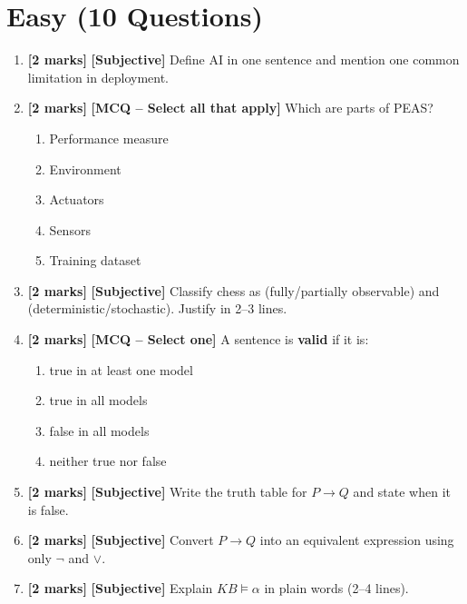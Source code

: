 \documentclass[11pt,a4paper]{article}
\newcommand{\EMarks}{\textbf{[2 marks]} }
\begin{document}
\vspace{0.6em}

\section*{Easy (10 Questions)}
\begin{enumerate}[label=\textbf{E\arabic*.}, leftmargin=*]
  \item \EMarks \textbf{[Subjective]} Define AI in one sentence and mention one common limitation in deployment.

  \item \EMarks \textbf{[MCQ -- Select all that apply]} Which are parts of PEAS?
    \begin{enumerate}[label=(\Alph*), leftmargin=*]
      \item Performance measure
      \item Environment
      \item Actuators
      \item Sensors
      \item Training dataset
    \end{enumerate}

  \item \EMarks \textbf{[Subjective]} Classify chess as (fully/partially observable) and (deterministic/stochastic). Justify in 2--3 lines.

  \item \EMarks \textbf{[MCQ -- Select one]} A sentence is \textbf{valid} if it is:
    \begin{enumerate}[label=(\Alph*), leftmargin=*]
      \item true in at least one model
      \item true in all models
      \item false in all models
      \item neither true nor false
    \end{enumerate}

  \item \EMarks \textbf{[Subjective]} Write the truth table for $P \rightarrow Q$ and state when it is false.

  \item \EMarks \textbf{[Subjective]} Convert $P \rightarrow Q$ into an equivalent expression using only $\lnot$ and $\lor$.

  \item \EMarks \textbf{[Subjective]} Explain $KB \models \alpha$ in plain words (2--4 lines).


\end{enumerate}
\end{document}
